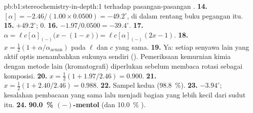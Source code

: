 \begin{solution}{pb:b1:stereochemistry-in-depth:1}
terhadap pasangan-pasangan .
\textbf{14.} $[\alpha] = -2.46/(1.00 \times 0.0500) = -49.2^\circ$, di
dalam rentang buku pegangan itu.
\textbf{15.} $+49.2^\circ$; $0$.
\textbf{16.} $-1.97/0.0500 = -39.4^\circ$.
\textbf{17.} $\alpha = \ell c[\alpha]_{(-)}\bigl(x - (1 - x)\bigr) =
\ell c[\alpha]_{(-)}(2x - 1)$.
\textbf{18.} $x = \frac12(1 + \alpha/\alpha_{\text{acuan}})$ pada $\ell$
dan $c$ yang sama.
\textbf{19.} Ya: setiap senyawa lain yang aktif optis menambahkan
sukunya sendiri (). Pemeriksaan kemurnian kimia dengan metode
lain (kromatografi) diperlukan sebelum membaca rotasi sebagai komposisi.
\textbf{20.} $x = \frac12(1 + 1.97/2.46) = 0.900$.
\textbf{21.} $x = \frac12(1 + 2.40/2.46) = 0.988$.
\textbf{22.} Sampel kedua (\qty{98.8}{\percent}).
\textbf{23.} $-3.94^\circ$; kesalahan pembacaan yang sama lalu menjadi
bagian yang lebih kecil dari sudut itu.
\textbf{24.} \textbf{\qty{90.0}{\percent} $(-)$-mentol} (dan
\qty{10.0}{\percent} ).
\end{solution}
